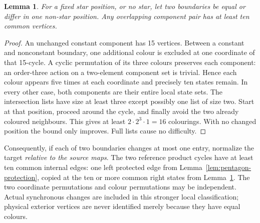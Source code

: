 \documentclass[11pt]{article}
\newtheorem{lemma}[theorem]{Lemma}
\theoremstyle{remark}
\numberwithin{equation}{section}
\numberwithin{table}{section}
\begin{document}
\begin{lemma}\label{lem:pentagon-overlap}
For a fixed star position, or no star, let two boundaries be equal or
differ in one non-star position. Any overlapping component pair has
at least ten common vertices.
\end{lemma}
\begin{proof}
An unchanged constant component has 15 vertices. Between a constant
and nonconstant boundary, one additional colour is excluded at one
coordinate of that 15-cycle. A cyclic permutation of its three colours
preserves each component: an order-three action on a two-element
component set is trivial. Hence each colour appears five times at
each coordinate and precisely ten states remain.
In every other case, both components are their entire local state
sets. The intersection lists have size at least three except possibly
one list of size two. Start at that position, proceed around the
cycle, and finally avoid the two already coloured neighbours.
This gives at least $2\cdot2^3\cdot1=16$ colourings. With no changed
position the bound only improves. Full lists cause no difficulty.
\end{proof}

Consequently, if each of two boundaries changes at most one entry,
normalize the target \emph{relative to the source maps}. The two
reference product cycles have at least ten common internal edges:
one left protected edge from Lemma~\ref{lem:pentagon-protection},
copied at the ten or more common right states from
Lemma~\ref{lem:pentagon-overlap}.
The two coordinate permutations and colour permutations may be
independent. Actual synchronous changes are included in this stronger
local classification; physical exterior vertices are never identified
merely because they have equal colours.
\end{document}
